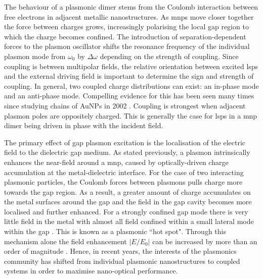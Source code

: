 \documentclass{article}
\begin{document}
The behaviour of a plasmonic dimer stems from the Coulomb interaction between free electrons in adjacent metallic nanostructures. As \glspl{mnp} move closer together the force between charges grows, increasingly polarising the local gap region to which the charge becomes confined. The introduction of separation-dependent forces to the plasmon oscillator shifts the resonance frequency of the individual plasmon mode from $\omega_0$ by $\Delta\omega$ depending on the strength of coupling. Since coupling is between multipolar fields, the relative orientation between excited \glspl{lsp} and the external driving field is important to determine the sign and strength of coupling.
In general, two coupled charge distributions can exist: an in-phase mode and an anti-phase mode. Compelling evidence for this has been seen many times since studying chains of AuNPs in 2002 \cite{maier2002}.
Coupling is strongest when adjacent plasmon poles are oppositely charged. This is generally the case for \glspl{lsp} in a \gls{mnp} dimer being driven in phase with the incident field.

The primary effect of gap plasmon excitation is the localisation of the electric field to the dielectric gap medium. As stated previously, a plasmon intrinsically enhances the near-field around a \gls{mnp}, caused by optically-driven charge accumulation at the metal-dielectric interface. For the case of two interacting plasmonic particles, the Coulomb forces between plasmons pulls charge more towards the gap region. As a result, a greater amount of charge accumulates on the metal surfaces around the gap and the field in the gap cavity becomes more localised and further enhanced.
For a strongly confined gap mode there is very little field in the metal with almost all field confined within a small lateral mode within the gap \cite{romero2006}. This is known as a plasmonic ``hot spot". Through this mechanism alone the field enhancement $\left|E/E_0\right|$ can be increased by more than an order of magnitude \cite{hao2004, talley2005}. Hence, in recent years, the interests of the plasmonics community has shifted from individual plasmonic nanostructures to coupled systems in order to {\color{red}maximise nano-optical performance}.
\end{document}
